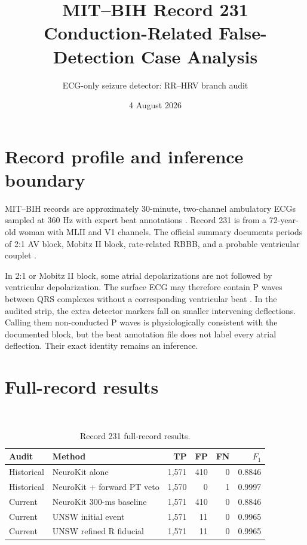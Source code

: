\documentclass[10pt]{article}
\title{MIT--BIH Record 231\\Conduction-Related False-Detection Case Analysis}
\author{ECG-only seizure detector: RR--HRV branch audit}
\date{4 August 2026}
\begin{document}
\maketitle


\section{Record profile and inference boundary}
MIT--BIH records are approximately 30-minute, two-channel ambulatory ECGs sampled at 360 Hz with expert beat annotations \cite{moody2001mitbih,physionetmitdb,goldberger2000physiobank}. Record 231 is from a 72-year-old woman with MLII and V1 channels. The official summary documents periods of 2:1 AV block, Mobitz II block, rate-related RBBB, and a probable ventricular couplet \cite{physionetmitdb}.

In 2:1 or Mobitz II block, some atrial depolarizations are not followed by ventricular depolarization. The surface ECG may therefore contain P waves between QRS complexes without a corresponding ventricular beat \cite{surawicz2009conduction}. In the audited strip, the extra detector markers fall on smaller intervening deflections. Calling them non-conducted P waves is physiologically consistent with the documented block, but the beat annotation file does not label every atrial deflection. Their exact identity remains an inference.

\section{Full-record results}
\metricdef\ \provenance

\begin{table}[H]
\centering
\caption{Record 231 full-record results.}
\begin{tabular}{@{}llrrrr@{}}
\toprule
Audit & Method & TP & FP & FN & $F_1$\\
\midrule
Historical & NeuroKit alone & 1,571 & 410 & 0 & 0.8846\\
Historical & NeuroKit + forward PT veto & 1,570 & 0 & 1 & 0.9997\\
Current & NeuroKit 300-ms baseline & 1,571 & 410 & 0 & 0.8846\\
Current & UNSW initial event & 1,571 & 11 & 0 & 0.9965\\
Current & UNSW refined R fiducial & 1,571 & 11 & 0 & 0.9965\\
\bottomrule
\end{tabular}
\end{table}
\end{document}
